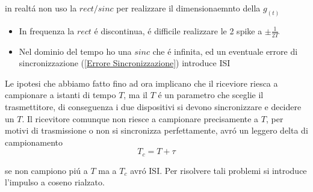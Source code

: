             in realtá non uso la $rect/sinc$ per realizzare il dimensionaemnto della $g_{(t)}$ 
            \begin{itemize}
                \item {In frequenza la $rect$ é discontinua, é difficile realizzare le 2 spike a $\pm\frac{1}{2T}$}
                \item {Nel dominio del tempo ho una $sinc$ che é infinita, ed un eventuale errore di sincronizzazione
                (\ref{Errore Sincronizzazione}) introduce ISI}
            \end{itemize}
            Le ipotesi che abbiamo fatto fino ad ora implicano che il riceviore riesca a campionare a istanti
            di tempo $T$, ma il $T$ é un parametro che sceglie il trasmettitore, di conseguenza \label{Errore Sincronizzazione}
            i due dispositivi si devono sincronizzare e decidere un $T$. Il ricevitore comunque non riesce a campionare
            precisamente a $T$, per motivi di trasmissione o non si sincronizza perfettamente, avró un leggero delta di campionamento
            \[
                T_c = T+ \tau  
            \]
            \begin{figure}[H]
                \centering
            \end{figure}
            se non campiono piú a $T$ ma a $T_c$ avró ISI. Per risolvere tali problemi si introduce l'impulso a coseno rialzato.
            
